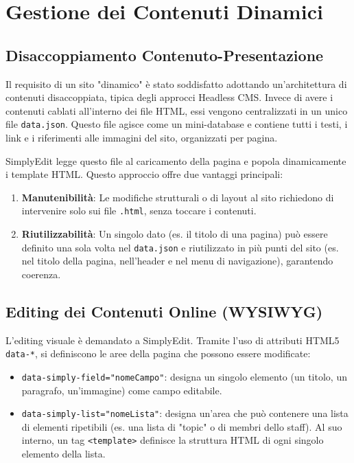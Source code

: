 \section{Gestione dei Contenuti Dinamici}
\subsection{Disaccoppiamento Contenuto-Presentazione}
Il requisito di un sito "dinamico" è stato soddisfatto adottando un'architettura di contenuti disaccoppiata, tipica degli approcci Headless CMS. Invece di avere i contenuti cablati all'interno dei file HTML, essi vengono centralizzati in un unico file \texttt{data.json}. Questo file agisce come un mini-database e contiene tutti i testi, i link e i riferimenti alle immagini del sito, organizzati per pagina.

SimplyEdit legge questo file al caricamento della pagina e popola dinamicamente i template HTML. Questo approccio offre due vantaggi principali:
\begin{enumerate}
    \item \textbf{Manutenibilità}: Le modifiche strutturali o di layout al sito richiedono di intervenire solo sui file \texttt{.html}, senza toccare i contenuti.
    \item \textbf{Riutilizzabilità}: Un singolo dato (es. il titolo di una pagina) può essere definito una sola volta nel \texttt{data.json} e riutilizzato in più punti del sito (es. nel titolo della pagina, nell'header e nel menu di navigazione), garantendo coerenza.
\end{enumerate}

\subsection{Editing dei Contenuti Online (WYSIWYG)}
L'editing visuale è demandato a SimplyEdit. Tramite l'uso di attributi HTML5 \texttt{data-*}, si definiscono le aree della pagina che possono essere modificate:
\begin{itemize}
    \item \texttt{data-simply-field="nomeCampo"}: designa un singolo elemento (un titolo, un paragrafo, un'immagine) come campo editabile.
    \item \texttt{data-simply-list="nomeLista"}: designa un'area che può contenere una lista di elementi ripetibili (es. una lista di "topic" o di membri dello staff). Al suo interno, un tag \texttt{<template>} definisce la struttura HTML di ogni singolo elemento della lista.
\end{itemize}

